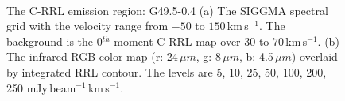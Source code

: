 \documentclass[manuscript]{aastex61}
\newcommand{\kms}{\,km\,s$^{-1}$}
\newcommand{\um}{\mu m}
\begin{document}
\begin{figure}[H]
	\centering
	\\
	\caption{The C-RRL emission region: G49.5-0.4
	(a) The SIGGMA spectral grid with the velocity range from $-50$ to $150$\kms.
	The background is the 0$^{th}$ moment C-RRL map over $30$ to $70$\kms.
	(b) The infrared RGB color map (r: 24\,$\um$, g: 8\,$\um$, b: 4.5\,$\um$) overlaid by integrated RRL contour.
	The levels are 5, 10, 25, 50, 100, 200, 250 mJy\,beam$^{-1}$\kms.}
	\label{fig_crrl-g494}
\end{figure}
\end{document}
